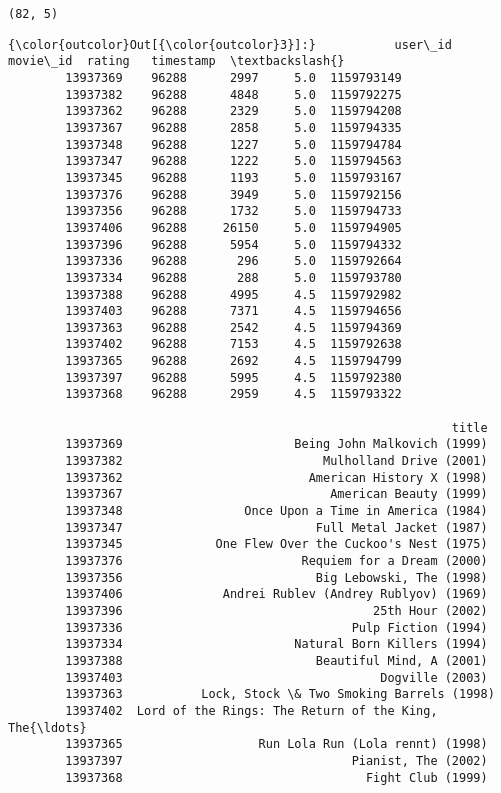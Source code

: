 \documentclass[11pt]{article}
\begin{document}
    \begin{Verbatim}[commandchars=\\\{\}]
(82, 5)

    \end{Verbatim}

\begin{Verbatim}[commandchars=\\\{\}]
{\color{outcolor}Out[{\color{outcolor}3}]:}           user\_id  movie\_id  rating   timestamp  \textbackslash{}
        13937369    96288      2997     5.0  1159793149
        13937382    96288      4848     5.0  1159792275
        13937362    96288      2329     5.0  1159794208
        13937367    96288      2858     5.0  1159794335
        13937348    96288      1227     5.0  1159794784
        13937347    96288      1222     5.0  1159794563
        13937345    96288      1193     5.0  1159793167
        13937376    96288      3949     5.0  1159792156
        13937356    96288      1732     5.0  1159794733
        13937406    96288     26150     5.0  1159794905
        13937396    96288      5954     5.0  1159794332
        13937336    96288       296     5.0  1159792664
        13937334    96288       288     5.0  1159793780
        13937388    96288      4995     4.5  1159792982
        13937403    96288      7371     4.5  1159794656
        13937363    96288      2542     4.5  1159794369
        13937402    96288      7153     4.5  1159792638
        13937365    96288      2692     4.5  1159794799
        13937397    96288      5995     4.5  1159792380
        13937368    96288      2959     4.5  1159793322

                                                              title
        13937369                        Being John Malkovich (1999)
        13937382                            Mulholland Drive (2001)
        13937362                          American History X (1998)
        13937367                             American Beauty (1999)
        13937348                 Once Upon a Time in America (1984)
        13937347                           Full Metal Jacket (1987)
        13937345             One Flew Over the Cuckoo's Nest (1975)
        13937376                         Requiem for a Dream (2000)
        13937356                           Big Lebowski, The (1998)
        13937406              Andrei Rublev (Andrey Rublyov) (1969)
        13937396                                   25th Hour (2002)
        13937336                                Pulp Fiction (1994)
        13937334                        Natural Born Killers (1994)
        13937388                           Beautiful Mind, A (2001)
        13937403                                    Dogville (2003)
        13937363           Lock, Stock \& Two Smoking Barrels (1998)
        13937402  Lord of the Rings: The Return of the King, The{\ldots}
        13937365                   Run Lola Run (Lola rennt) (1998)
        13937397                                Pianist, The (2002)
        13937368                                  Fight Club (1999)
\end{Verbatim}
\end{document}
